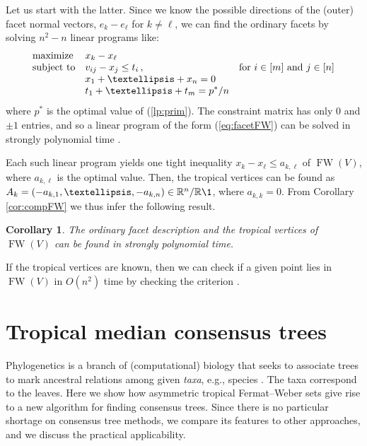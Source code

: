 \documentclass[a4paper,12pt]{amsart}
\newcommand\RR{{\mathbb R}}
\newcommand\torus[1]{\RR^{#1}/\RR\1} %
\DeclareMathOperator{\FW}{FW} %
\newtheorem{corollary}[theorem]{Corollary}
\theoremstyle{remark}
\begin{document}
Let us start with the latter.
Since we know the possible directions of the (outer) facet normal vectors, $e_k-e_\ell$ for $k\neq\ell$, we can find the ordinary facets by solving $n^2-n$ linear programs like:
\begin{equation} \label{eq:facetFW}
  \begin{array}{ll@{}ll}
    \text{maximize}  & \displaystyle  x_k - x_\ell& \\
    \text{subject to}& \displaystyle v_{ij} - x_j \leq t_i \,, & \quad \text{for } i\in[m] \text{ and } j\in[n] \\
                     & \displaystyle x_{1} + \dots + x_{n} = 0  & \\
                     & \displaystyle t_{1} + \dots + t_{m} = p^*/n &
    \end{array}
\end{equation}
where $p^*$ is the optimal value of (\ref{lp:prim}).
The constraint matrix has only $0$ and $\pm 1$ entries, and so a linear program of the form (\ref{eq:facetFW}) can be solved in strongly polynomial time \cite[Corollary~15.3a]{Schrijver:1986}.

Each such linear program yields one tight inequality $x_k-x_\ell\leq a_{k,\ell}$ of $\FW(V)$, where $a_{k,\ell}$ is the optimal value.
Then, the tropical vertices can be found as $A_k=(-a_{k,1},\dots,-a_{k,n})\in\torus{n}$, where $a_{k,k}=0$.
From Corollary \ref{cor:compFW} we thus infer the following result.
	
\begin{corollary} \label{cor:strongPoly}
  The ordinary facet description and the tropical vertices of $\FW(V)$ can be found in strongly polynomial time.
\end{corollary}
If the tropical vertices are known, then we can check if a given point lies in $\FW(V)$ in $O(n^2)$ time by checking the criterion \cite[Proposition 5.37]{ETC}.

\section{Tropical median consensus trees}
\label{sec:trees}
\noindent
Phylogenetics is a branch of (computational) biology that seeks to associate trees to mark ancestral relations among given \emph{taxa}, e.g., species \cite{SempleSteel:2003}.
The taxa correspond to the leaves.
Here we show how asymmetric tropical Fermat--Weber sets give rise to a new algorithm for finding consensus trees.
Since there is no particular shortage on consensus tree methods, we compare its features to other approaches, and we discuss the practical applicability.
\end{document}
